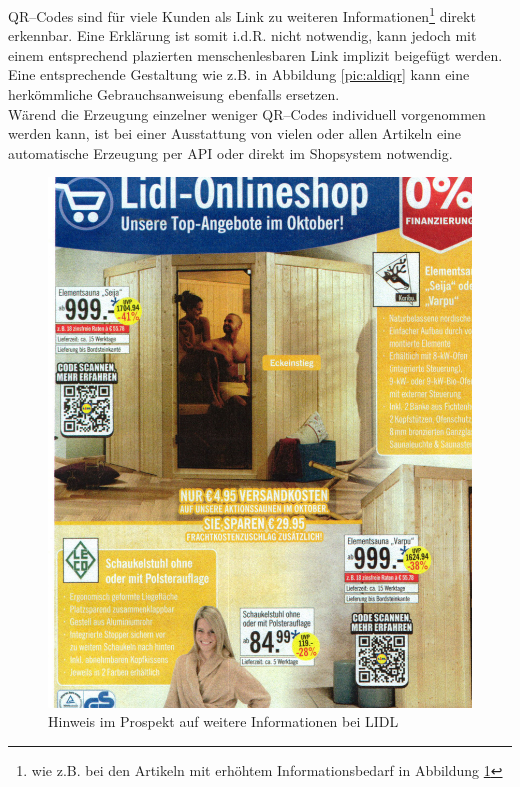 QR--Codes sind für viele Kunden als Link zu weiteren Informationen\footnote{wie z.B. bei den Artikeln mit erhöhtem Informationsbedarf in Abbildung \ref{pic:lidlqr}} direkt erkennbar. Eine Erklärung ist somit i.d.R. nicht notwendig, kann jedoch mit einem entsprechend plazierten menschenlesbaren Link implizit beigefügt werden. Eine entsprechende Gestaltung wie z.B. in Abbildung \ref{pic:aldiqr} kann eine herkömmliche Gebrauchsanweisung ebenfalls ersetzen.
\\Wärend die Erzeugung einzelner weniger QR--Codes individuell vorgenommen werden kann, ist bei einer Ausstattung von vielen oder allen Artikeln eine automatische Erzeugung per \ac{API} oder direkt im Shopsystem notwendig.

\begin{minipage}[t]{0.4\textwidth}
\begin{figure}[H]
\begin{center}
\includegraphics[width=\textwidth]{LIDL-QR.jpg}
\caption{Hinweis im Prospekt auf weitere Informationen bei LIDL}
\label{pic:lidlqr}
\end{center}
\end{figure}
\end{minipage}
